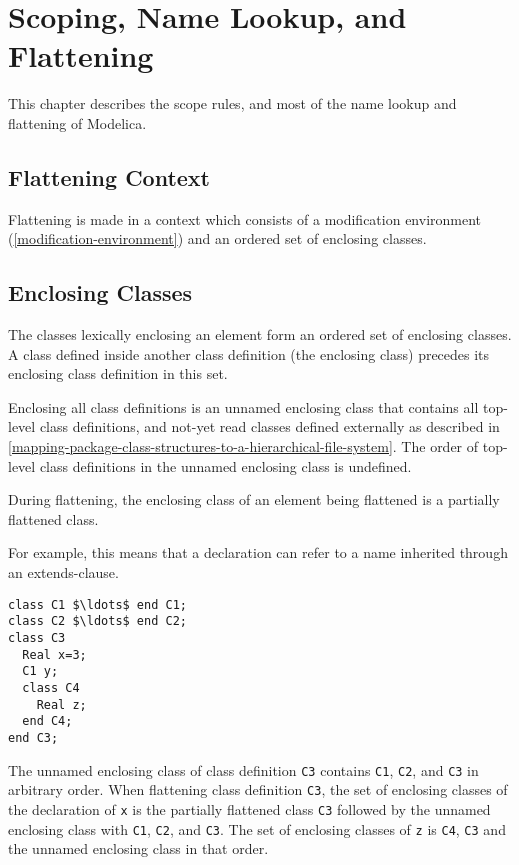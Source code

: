 \chapter{Scoping, Name Lookup, and Flattening}\label{scoping-name-lookup-and-flattening}

This chapter describes the scope rules, and most of the name lookup and
flattening of Modelica.

\section{Flattening Context}\label{flattening-context}

Flattening is made in a context which consists of a modification
environment (\cref{modification-environment}) and an ordered set of enclosing classes.

\section{Enclosing Classes}\label{enclosing-classes}

The classes lexically enclosing an element form an ordered set of
enclosing classes. A class defined inside another class definition (the
enclosing class) precedes its enclosing class definition in this set.

Enclosing all class definitions is an unnamed enclosing class that
contains all top-level class definitions, and not-yet read classes
defined externally as described in \cref{mapping-package-class-structures-to-a-hierarchical-file-system}. The order of
top-level class definitions in the unnamed enclosing class is undefined.

During flattening, the enclosing class of an element being flattened is
a partially flattened class.

\begin{nonnormative}
For example, this means that a declaration can refer to a name inherited through an extends-clause.
\end{nonnormative}

\begin{example}
\begin{lstlisting}[language=modelica]
class C1 $\ldots$ end C1;
class C2 $\ldots$ end C2;
class C3
  Real x=3;
  C1 y;
  class C4
    Real z;
  end C4;
end C3;
\end{lstlisting}

The unnamed enclosing class of class definition \lstinline!C3! contains \lstinline!C1!,
\lstinline!C2!, and \lstinline!C3! in arbitrary order. When flattening class definition \lstinline!C3!, the
set of enclosing classes of the declaration of \lstinline!x! is the partially
flattened class \lstinline!C3! followed by the unnamed enclosing class with \lstinline!C1!, \lstinline!C2!,
and \lstinline!C3!. The set of enclosing classes of \lstinline!z! is \lstinline!C4!, \lstinline!C3! and the unnamed
enclosing class in that order.
\end{example}

